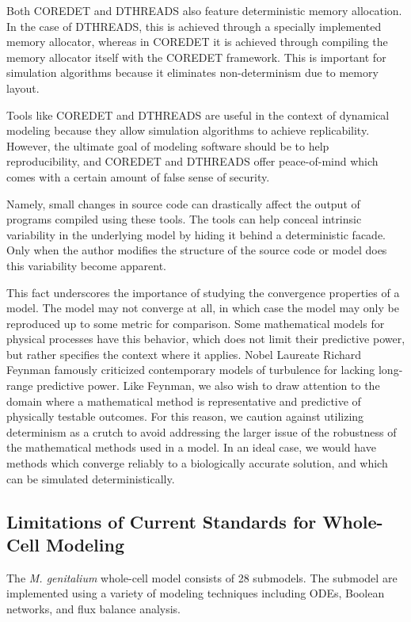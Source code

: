 \documentclass[journal,transmag,twoside]{IEEEtran}
\begin{document}
Both C{\small ORE}D{\small ET} and D{\small THREADS} also
feature deterministic memory allocation. In the case of D{\small THREADS},
this is achieved through a specially implemented memory allocator,
whereas in C{\small ORE}D{\small ET} it is achieved through compiling the
memory allocator itself with the C{\small ORE}D{\small ET} framework.
This is important for simulation algorithms because it eliminates non-determinism
due to memory layout.

Tools like C{\small ORE}D{\small ET} and D{\small THREADS} are useful in the context of
dynamical modeling because they allow simulation algorithms to achieve replicability.
However, the ultimate goal of modeling software should be to help reproducibility,
and C{\small ORE}D{\small ET} and D{\small THREADS} offer peace-of-mind which comes
with a certain amount of false sense of security.

Namely, small changes in source code can drastically affect the output of programs
compiled using these tools. The tools can help conceal intrinsic variability in the
underlying model by hiding it behind a deterministic facade.
Only when the author modifies the structure of the source code or model does this
variability become apparent.

This fact underscores the importance of studying the convergence properties of a model.
The model may not converge at all, in which case the model may only be reproduced up to
some metric for comparison. Some mathematical models for physical processes have this
behavior, which does not limit their predictive power, but rather specifies the context
where it applies.
Nobel Laureate Richard Feynman famously criticized contemporary models of turbulence
for lacking long-range predictive power.
Like Feynman, we also wish to draw attention to the domain where a mathematical method
is representative and predictive of physically testable outcomes.
For this reason, we caution against utilizing determinism as a crutch to avoid
addressing the larger issue of the robustness of the mathematical methods used in a model.
In an ideal case, we would have methods which converge reliably to a biologically accurate
solution, and which can be simulated deterministically.

\subsection{Limitations of Current Standards for Whole-Cell Modeling}

The \textit{M. genitalium} whole-cell model \cite{Karr2012} consists of 28 submodels.
The submodel are implemented using a variety of modeling techniques including 
ODEs, Boolean networks, and flux balance analysis.
\end{document}
